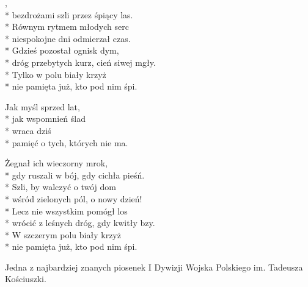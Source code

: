 
\begin{lyrics}[longestline={dróg przebytych kurz, cień siwej mgły.}]

,\\*
bezdrożami szli przez śpiący las.\\*
Równym rytmem młodych serc\\*
niespokojne dni odmierzał czas.\\*
Gdzieś pozostał ognisk dym,\\*
dróg przebytych kurz, cień siwej mgły.\\*
Tylko w polu biały krzyż\\*
nie pamięta już, kto pod nim śpi.

Jak myśl sprzed lat,\\*
jak wspomnień ślad\\*
wraca dziś\\*
pamięć o tych, których nie ma.

Żegnał ich wieczorny mrok,\\*
gdy ruszali w bój, gdy cichła pieśń.\\*
Szli, by walczyć o twój dom\\*
wśród zielonych pól, o nowy dzień!\\*
Lecz nie wszystkim pomógł los\\*
wrócić z leśnych dróg, gdy kwitły bzy.\\*
W szczerym polu biały krzyż\\*
nie pamięta już, kto pod nim śpi.
\end{lyrics}



\begin{info}Jedna z najbardziej znanych piosenek I Dywizji Wojska Polskiego im. Tadeusza Kościuszki.\end{info}

